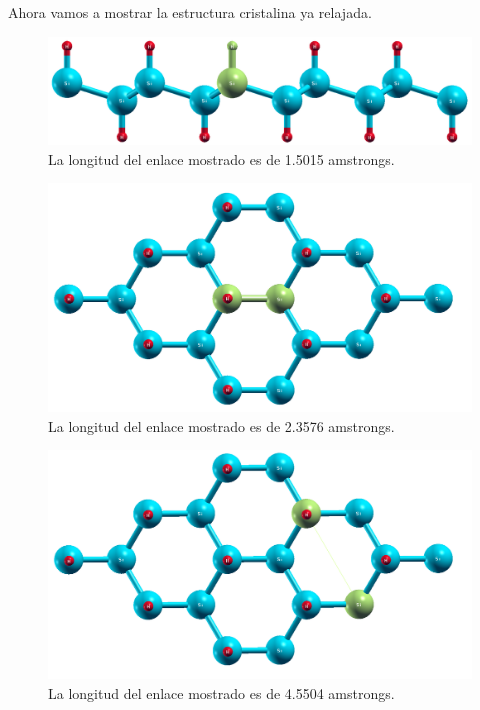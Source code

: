 \vspace{0.5cm}

\noindent
Ahora vamos a mostrar la estructura cristalina ya relajada.

\vspace{0.5cm}

\begin{figure}[H]
    \centering
    \includegraphics[scale=0.30]{images_silicano/Longitud_enlace_H_Si_1_5015_amstrongs.png}
    \caption{La longitud del enlace mostrado es de 1.5015 amstrongs.}
\end{figure}

\vspace{0.5cm}

\begin{figure}[H]
    \centering
    \includegraphics[scale=0.34]{images_silicano/Longitud_enlace_Si_Si_2_3576_amstrongs.png}
    \caption{La longitud del enlace mostrado es de 2.3576 amstrongs.}
\end{figure}

\vspace{0.5cm}

\begin{figure}[H]
    \centering
    \includegraphics[scale=0.34]{images_silicano/Longitud_enlace_Si_Si_4_5504_amstrongs.png}
    \caption{La longitud del enlace mostrado es de 4.5504 amstrongs.}
\end{figure}


